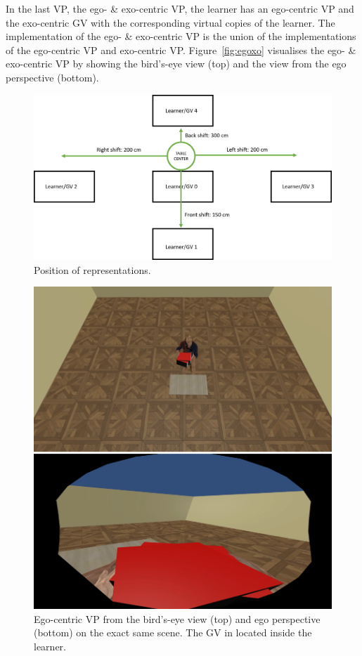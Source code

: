 In the last VP, the ego- \& exo-centric VP, the learner has an ego-centric VP and the exo-centric GV with the corresponding virtual copies of the learner. The implementation of the ego- \& exo-centric VP is the union of the implementations of the ego-centric VP and exo-centric VP. Figure~\ref{fig:egoxo} visualises the ego- \& exo-centric VP by showing the bird's-eye view (top) and the view from the ego perspective (bottom).\\
\begin{figure}[htb]
	\centering
	\includegraphics[width=\textwidth]{figures/positions.png}
	\caption[Positions of representations.]{Position of representations.}
	\label{fig:multireppositions}
\end{figure}
\begin{figure}[H]
	\centering
	\includegraphics[width=\textwidth]{figures/perspectiveEGO.png}
	\caption[Ego-centric visual perspective]{Ego-centric VP from the bird's-eye view (top) and ego perspective (bottom) on the exact same scene. The GV in located inside the learner.}
	\label{fig:ego}
\end{figure}
